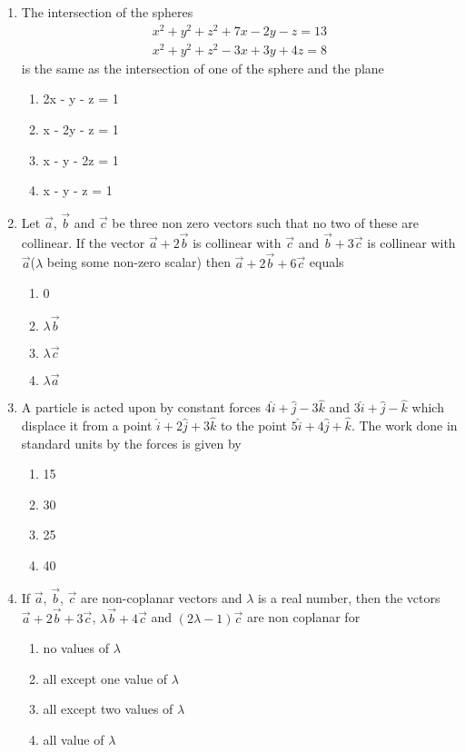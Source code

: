 \begin{enumerate}[label=\arabic*.,ref=\thesubsection.\theenumi]
\item The intersection of the spheres
\begin{align}
x^2 + y^2 + z^2 + 7x - 2y - z = 13
\end{align}
\begin{align}
x^2 + y^2 + z^2 - 3x + 3y + 4z = 8
\end{align}
is the same as the intersection of one of the sphere and the plane
\begin{enumerate}
\item 2x - y - z = 1
\item x - 2y - z = 1
\item x - y - 2z = 1
\item x - y - z = 1
\end{enumerate}

\item Let $\overrightarrow{a}$, $\overrightarrow{b}$ and $\overrightarrow{c}$ be three non zero vectors such that no two of these are collinear. If the vector $\overrightarrow{a} + 2\overrightarrow{b}$ is collinear with $\overrightarrow{c}$ and $\overrightarrow{b} + 3\overrightarrow{c}$ is collinear with $\overrightarrow{a}$($\lambda$ being some non-zero scalar) then $\overrightarrow{a} + 2\overrightarrow{b} + 6\overrightarrow{c}$ equals
\begin{enumerate}
\item 0
\item $\lambda\overrightarrow{b}$
\item $\lambda\overrightarrow{c}$
\item $\lambda\overrightarrow{a}$
\end{enumerate}

\item A particle is acted upon by constant forces $4\hat{i} + \hat{j} - 3\hat{k}$ and $3\hat{i} + \hat{j} - \hat{k}$ which displace it from a point $\hat{i} + 2\hat{j} + 3\hat{k}$ to the point $5\hat{i} + 4\hat{j} + \hat{k}$. The work done in standard units by the forces is given by
\begin{enumerate}
\item 15
\item 30
\item 25
\item 40
\end{enumerate}

\item If $\overrightarrow{a}$, $\overrightarrow{b}$, $\overrightarrow{c}$ are non-coplanar vectors and $\lambda$ is a real number, then the vctors $\overrightarrow{a} + 2\overrightarrow{b} + 3\overrightarrow{c}$, $\lambda\overrightarrow{b}  + 4\overrightarrow{c}$ and $(2\lambda - 1)\overrightarrow{c}$ are non coplanar for
\begin{enumerate}
\item no values of $\lambda$
\item all except one value of $\lambda$
\item all except two values of $\lambda$
\item all value of $\lambda$
\end{enumerate}


\end{enumerate}
